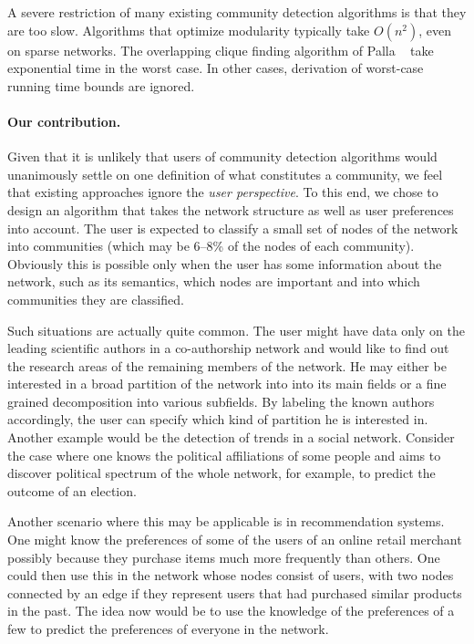 A severe restriction of many existing community detection algorithms 
is that they are too slow. Algorithms that optimize modularity typically 
take $O(n^2)$, even on sparse networks. The overlapping clique finding 
algorithm of Palla \etal~\cite{PDFV05} take exponential time in the worst case.
In other cases, derivation of worst-case running time bounds are ignored. 

\paragraph{Our contribution.}
Given that it is unlikely that users of community detection algorithms 
would unanimously settle on one definition of what constitutes a community, 
we feel that existing approaches ignore the \emph{user perspective}.
To this end, we chose to design an algorithm that takes the network structure 
as well as user preferences into account. 
The user is expected to classify a small set of nodes of the network 
into communities (which may be 6--8\% of the nodes of each community).
Obviously this is possible only when the user has some 
information about the network, such as its semantics, which nodes 
are important and into which communities they are classified. 

Such situations are actually quite common. The user might have data only 
on the leading scientific authors in a co-authorship network 
and would like to find out the research areas of the remaining members of the network. 
He may either be interested in a broad partition of the network into into its main fields
or a fine grained decomposition into various subfields.
By labeling the known authors accordingly,
the user can specify which kind of partition he is interested in.
Another example would be the detection of trends in a social network.
Consider the case where one knows the political affiliations of some people 
and aims to discover political spectrum of the whole network, 
for example, to predict the outcome of an election. 


Another scenario where this may be applicable is in recommendation systems. 
One might know the preferences of some of the users of an online retail 
merchant possibly because they purchase items much more frequently than others. 
One could then use this in the network whose nodes consist of users, with two 
nodes connected by an edge if they represent users that had purchased similar products in the past. 
The idea now would be to use the knowledge of the preferences of a few to 
predict the preferences of everyone in the network. 



